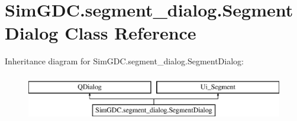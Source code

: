 \hypertarget{class_sim_g_d_c_1_1segment__dialog_1_1_segment_dialog}{}\section{Sim\+G\+D\+C.\+segment\+\_\+dialog.\+Segment\+Dialog Class Reference}
\label{class_sim_g_d_c_1_1segment__dialog_1_1_segment_dialog}
Inheritance diagram for Sim\+G\+D\+C.\+segment\+\_\+dialog.\+Segment\+Dialog\+:\begin{figure}[H]
\begin{center}
\leavevmode
\includegraphics[height=2.000000cm]{class_sim_g_d_c_1_1segment__dialog_1_1_segment_dialog}
\end{center}
\end{figure}
